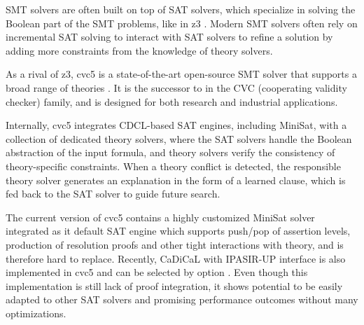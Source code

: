 SMT solvers are often built on top of SAT solvers, which specialize in solving the Boolean part of the SMT problems, like in z3 \cite{10.1007/978-3-540-78800-3_24}. Modern SMT solvers often rely on incremental SAT solving to interact with SAT solvers to refine a solution by adding more constraints from the knowledge of theory solvers.

As a rival of z3, cvc5 is a state-of-the-art open-source SMT solver that supports a broad range of theories \cite{10.1007/978-3-030-99524-9_24}. It is the successor to  in the CVC (cooperating validity checker) family, and is designed for both research and industrial applications.

Internally, cvc5 integrates CDCL-based SAT engines, including  MiniSat, with a collection of dedicated theory solvers, where the SAT solvers handle the Boolean abstraction of the input formula, and theory solvers verify the consistency of theory-specific constraints. When a theory conflict is detected, the responsible theory solver generates an explanation in the form of a learned clause, which is fed back to the SAT solver to guide future search.

The current version of cvc5 contains a highly customized MiniSat solver integrated as it default SAT engine which supports push/pop of assertion levels, production of resolution proofs and other tight interactions with theory, and is therefore hard to replace. Recently, CaDiCaL with IPASIR-UP interface is also implemented in cvc5 and can be selected by option . Even though this implementation is still lack of proof integration, it shows potential to be easily adapted to other SAT solvers and promising performance outcomes without many optimizations.
